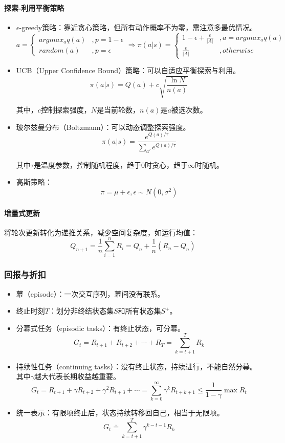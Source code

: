 \documentclass[
12pt, %
a4paper, 
oneside, %
headinclude,footinclude, %
]{scrartcl}
\begin{document}
\paragraph{探索-利用平衡策略}
\begin{itemize}
\item $ \epsilon $-greedy策略：靠近贪心策略，但所有动作概率不为零，需注意多最优情况。
$$
a = \begin{cases} argmax_a q(a) &, p = 1 - \epsilon \\ random(a) &, p = \epsilon \end{cases}
\Rightarrow 
\pi(a|s) = \begin{cases} 1 - \epsilon + \frac{\epsilon}{|A|} &, a = argmax_a q(a) \\ \frac{\epsilon}{|A|} &, otherwise \end{cases}
$$
\item UCB（Upper Confidence Bound）策略：可以自适应平衡探索与利用。
$$ \pi(a|s) = Q(a) + c\sqrt{\frac{\ln N}{n(a)}} $$

其中，$ c $控制探索强度，$ N $是当前轮数，$ n(a) $是$ a $被选次数。
\item 玻尔兹曼分布（Boltzmann）：可以动态调整探索强度。
$$ \pi(a|s) = \frac{e^{Q(a)/\tau}}{\sum_{a'} e^{Q(a)/\tau}} $$

其中$ \tau $是温度参数，控制随机程度，趋于$ 0 $时贪心，趋于$ \infty $时随机。
\item 高斯策略：
$$ \pi = \mu + \epsilon, \epsilon \sim N(0, \sigma^2) $$
\end{itemize}
\paragraph{增量式更新}
将轮次更新转化为递推关系，减少空间复杂度，如运行均值：
$$ Q_{n + 1} = \frac{1}{n}\sum_{i = 1}^n R_i = Q_n + \frac{1}{n}(R_n - Q_n) $$
\subsubsection[回报与折扣]{回报与折扣}
\begin{itemize}
\item 幕（episode）：一次交互序列，幕间没有联系。
\item 终止时刻$ T $：划分非终结状态集$ S $和所有状态集$ S^+ $。
\item 分幕式任务（episodic tasks）：有终止状态，可分幕。
$$ G_t = R_{t + 1} + R_{t + 2} + \cdots + R_T = \sum_{k = t + 1}^T R_k $$
\item 持续性任务（continuing tasks）：没有终止状态，持续进行，不能自然分幕。其中$ \gamma $越大代表长期收益越重要。
$$ G_t = R_{t + 1} + \gamma R_{t + 2} + \gamma^2 R_{t + 3} + \cdots = \sum_{k = 0}^{\infty} \gamma^k R_{t + k + 1} \leq \frac{1}{1 - \gamma} \max R_t $$
\item 统一表示：有限项终止后，状态持续转移回自己，相当于无限项。
$$ G_t \doteq \sum_{k = t + 1}^{T} \gamma^{k - t - 1} R_k $$
\end{itemize}
\end{document}
